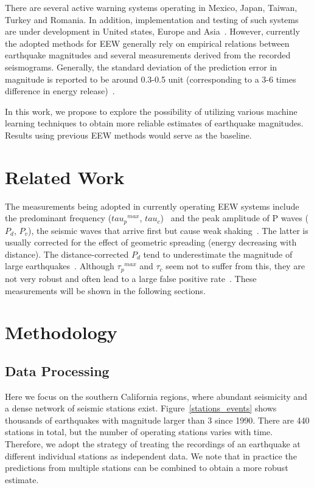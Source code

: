 \documentclass{article} %
\begin{document}
There are several active warning systems operating in Mexico, Japan, Taiwan, Turkey and Romania. In addition, implementation and testing of such systems are under development in United states, Europe and Asia~\cite{Allen2009, Strauss2016}. However, currently the adopted methods for EEW generally rely on empirical relations between earthquake magnitudes and several measurements derived from the recorded seismograms. Generally, the standard deviation of the prediction error in magnitude is reported to be around 0.3-0.5 unit (corresponding to a 3-6 times difference in energy release)~\cite{Bose2013}. 

In this work, we propose to explore the possibility of utilizing various machine learning techniques to obtain more reliable estimates of earthquake magnitudes. Results using previous EEW methods would serve as the baseline.


\section{Related Work}
 The measurements being adopted in currently operating EEW systems include the predominant frequency (${tau_p}^{max}$, $tau_c$)~\cite{Allen2003, Kanamori2005} and the peak amplitude of P waves ($P_d$, $P_v$), the seismic waves that arrive first but cause weak shaking~\cite{Wurman2007}. The latter is usually corrected for the effect of geometric spreading (energy decreasing with distance). The distance-corrected $P_d$ tend to underestimate the magnitude of large earthquakes~\cite{Wurman2007}. Although ${\tau_p}^{max}$ and $\tau_c$ seem not to suffer from this, they are not very robust and often lead to a large false positive rate~\cite{Wurman2007}. These measurements will be shown in the following sections.  

\section{Methodology}
\subsection{Data Processing}
Here we focus on the southern California regions, where abundant seismicity and a dense network of seismic stations exist. Figure~\ref{stations_events} shows thousands of earthquakes with magnitude larger than 3 since 1990. There are 440 stations in total, but the number of operating stations varies with time. Therefore, we adopt the strategy of treating the recordings of an earthquake at different individual stations as independent data. We note that in practice the predictions from multiple stations can be combined to obtain a more robust estimate.   
\end{document}
